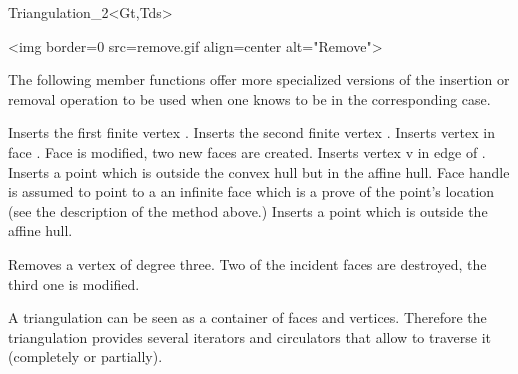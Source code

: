 \begin{ccClassTemplate}{Triangulation_2<Gt,Tds>}
\begin{ccHtmlOnly}
<img border=0 src=remove.gif align=center alt="Remove">
\end{ccHtmlOnly}


The following member functions offer more specialized versions of the
insertion or removal operation to be used when one knows to be in the
corresponding case.

{Inserts the first finite  vertex .}
{Inserts the second finite  vertex .}
 {Inserts vertex  in face
. Face  is modified,
two new faces are created.
}
{Inserts vertex v in edge  of .
}
{Inserts 
 a point which is outside the convex hull  but in the affine hull.
Face handle  is assumed to point to a an infinite face
which is a prove of the point's location (see the description of the
 method above.)
}
{Inserts 
 a point which is outside the affine hull.}

{Removes a vertex of degree three. Two of the incident faces are destroyed,
the third one is modified.
}









A triangulation can be seen as a container of faces and vertices.
Therefore the triangulation provides several iterators and circulators
that allow to traverse it (completely or partially).





\end{ccClassTemplate}
